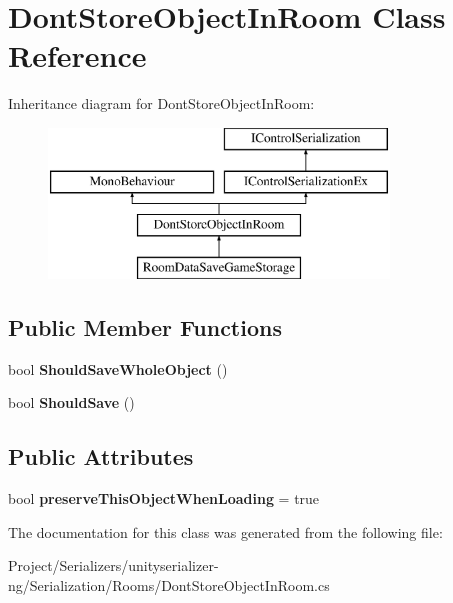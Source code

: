 \hypertarget{class_dont_store_object_in_room}{}\section{Dont\+Store\+Object\+In\+Room Class Reference}
\label{class_dont_store_object_in_room}
Inheritance diagram for Dont\+Store\+Object\+In\+Room\+:\begin{figure}[H]
\begin{center}
\leavevmode
\includegraphics[height=4.000000cm]{class_dont_store_object_in_room}
\end{center}
\end{figure}
\subsection*{Public Member Functions}
\begin{DoxyCompactItemize}
\item 
\mbox{\label{class_dont_store_object_in_room_ae64064ac5b1759f7a5694a4f617a03ed}} 
bool {\bfseries Should\+Save\+Whole\+Object} ()
\item 
\mbox{\label{class_dont_store_object_in_room_a710cc83ab8e061a58175a2c5bf3afa89}} 
bool {\bfseries Should\+Save} ()
\end{DoxyCompactItemize}
\subsection*{Public Attributes}
\begin{DoxyCompactItemize}
\item 
\mbox{\label{class_dont_store_object_in_room_a64b5902d6e6b768a25925edc74c4782d}} 
bool {\bfseries preserve\+This\+Object\+When\+Loading} = true
\end{DoxyCompactItemize}


The documentation for this class was generated from the following file\+:\begin{DoxyCompactItemize}
\item 
Project/\+Serializers/unityserializer-\/ng/\+Serialization/\+Rooms/Dont\+Store\+Object\+In\+Room.\+cs\end{DoxyCompactItemize}
